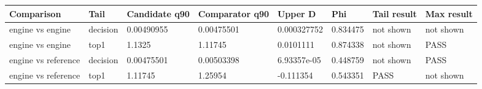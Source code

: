 \begin{tabular}{llllllll}
\toprule
Comparison & Tail & Candidate q90 & Comparator q90 & Upper D & Phi & Tail result & Max result \\
\midrule
engine vs engine & decision & 0.00490955 & 0.00475501 & 0.000327752 & 0.834475 & not shown & not shown \\
engine vs engine & top1 & 1.1325 & 1.11745 & 0.0101111 & 0.874338 & not shown & PASS \\
engine vs reference & decision & 0.00475501 & 0.00503398 & 6.93357e-05 & 0.448759 & not shown & PASS \\
engine vs reference & top1 & 1.11745 & 1.25954 & -0.111354 & 0.543351 & PASS & not shown \\
\bottomrule
\end{tabular}
